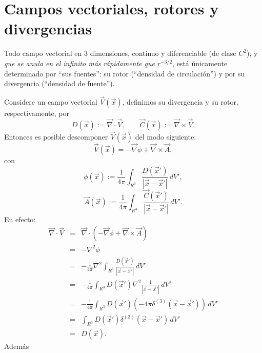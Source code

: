 \chapter{Campos vectoriales, rotores y divergencias}\label{Apcamps}
Todo campo vectorial en 3 dimensiones, continuo y diferenciable (de clase $C^2$), y \textit{que se anula en el infinito más rápidamente que} $r^{-3/2}$, está únicamente determinado por ``sus fuentes'': su rotor (``densidad de circulación'') y por su divergencia (``densidad de fuente'').

Considere un campo vectorial $\vec V(\vec x)$, definimos su divergencia y su
rotor, respectivamente, por
\begin{equation}
 D(\vec x):=\vec\nabla\cdot\vec V, \qquad \vec C(\vec x):=\vec\nabla\times\vec
V. \label{divrot}
\end{equation}
Entonces es posible descomponer $\vec V(\vec x)$ del modo siguiente:
\begin{equation}
 \vec V(\vec x)=-\vec\nabla\phi+\vec\nabla\times\vec A, \label{decomp1}
\end{equation}
con
\begin{equation}
 \phi(\vec x):=\frac{1}{4\pi}\int_{R^3}\frac{D(\vec x')}{\left|\vec x-\vec
x'\right|}\,dV',
\end{equation}
\begin{equation}
 \vec A(\vec x):=\frac{1}{4\pi}\int_{R^3}\frac{\vec C(\vec x')}{\left|\vec
x-\vec x'\right|}\,dV' .
\end{equation}
En efecto:
\begin{eqnarray}
\vec\nabla\cdot\vec
V&=&\vec\nabla\cdot\left(-\vec\nabla\phi+\vec\nabla\times\vec
A\right) \\
&=&-\nabla^2\phi \\
&=&- \frac{1}{4\pi}\nabla^2\int_{R^3}\frac{D(\vec x')}{\left|\vec x-\vec
x'\right|}\,dV'\\
&=&- \frac{1}{4\pi}\int_{R^3}D(\vec x')\nabla^2\frac{1}{\left|\vec x-\vec
x'\right|}\,dV'\\
&=&- \frac{1}{4\pi}\int_{R^3}D(\vec
x')\left(-4\pi\delta^{(3)}(\vec x-\vec x')\right)\,dV'\\
&=&\int_{R^3}D(\vec x')\delta^{(3)}(\vec x-\vec x')\,dV'\\
&=&D(\vec x).
\end{eqnarray}
Además
